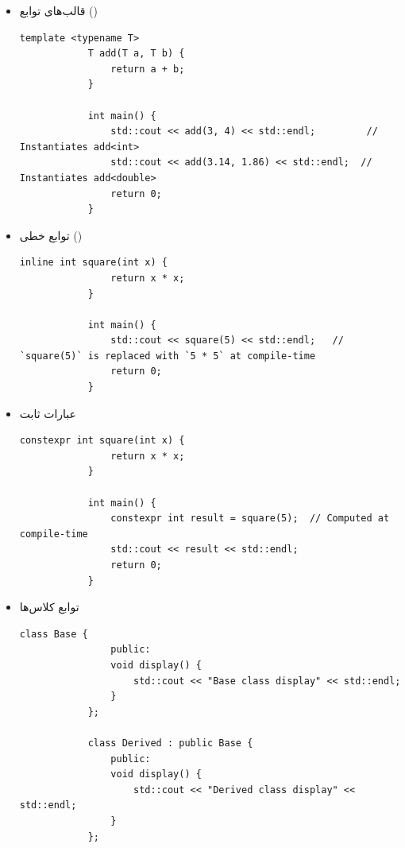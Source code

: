 \documentclass[12pt, a4paper]{report}
\begin{document}
\begin{itemize}
\begin{LTR}
\begin{lstlisting}[breaklines=true]
		\end{lstlisting}
	\end{LTR}
	
	
	\item قالب‌های توابع ()
	\begin{LTR} %
		\begin{lstlisting}[breaklines=true]
			template <typename T>
			T add(T a, T b) {
				return a + b;
			}
			
			int main() {
				std::cout << add(3, 4) << std::endl;         // Instantiates add<int>
				std::cout << add(3.14, 1.86) << std::endl;  // Instantiates add<double>
				return 0;
			}
		\end{lstlisting}
	\end{LTR}
	
	
	\item توابع خطی ()
	\begin{LTR} %
		\begin{lstlisting}[breaklines=true]
			inline int square(int x) {
				return x * x;
			}
			
			int main() {
				std::cout << square(5) << std::endl;   // `square(5)` is replaced with `5 * 5` at compile-time
				return 0;
			}
		\end{lstlisting}
	\end{LTR}
	
	
	\item عبارات ثابت
	\begin{LTR} %
		\begin{lstlisting}[breaklines=true]
			constexpr int square(int x) {
				return x * x;
			}
			
			int main() {
				constexpr int result = square(5);  // Computed at compile-time
				std::cout << result << std::endl;
				return 0;
			}
		\end{lstlisting}
	\end{LTR}
	
	
	
	\item توابع کلاس‌ها
	\begin{LTR} %
		\begin{lstlisting}[breaklines=true]
			class Base {
				public:
				void display() {
					std::cout << "Base class display" << std::endl;
				}
			};
			
			class Derived : public Base {
				public:
				void display() {
					std::cout << "Derived class display" << std::endl;
				}
			};
			

\end{lstlisting}
\end{LTR}
\end{itemize}
\end{document}
